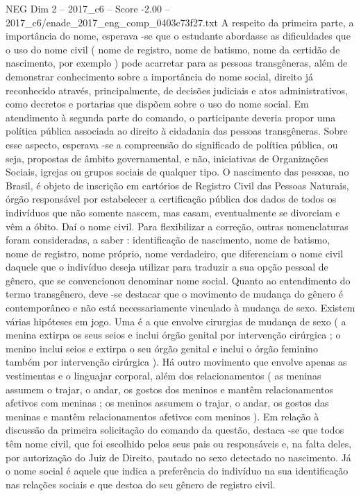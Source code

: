 \begin{textsample}{NEG Dim 2 – 2017\_c6 – Score -2.00 – 2017\_c6/enade\_2017\_eng\_comp\_0403c73f27.txt}
A respeito da primeira parte, a importância do nome, esperava -se que o estudante abordasse as dificuldades que o uso do nome civil ( nome de registro, nome de batismo, nome da certidão de nascimento, por exemplo ) pode acarretar para as pessoas transgêneras, além de demonstrar conhecimento sobre a importância do nome social, direito já reconhecido através, principalmente, de decisões judiciais e atos administrativos, como decretos e portarias que dispõem sobre o uso do nome social.
Em atendimento à segunda parte do comando, o participante deveria propor uma política pública associada ao direito à cidadania das pessoas transgêneras.
Sobre esse aspecto, esperava -se a compreensão do significado de política pública, ou seja, propostas de âmbito governamental, e não, iniciativas de Organizações Sociais, igrejas ou grupos sociais de qualquer tipo.
O nascimento das pessoas, no Brasil, é objeto de inscrição em cartórios de Registro Civil das Pessoas Naturais, órgão responsável por estabelecer a certificação pública dos dados de todos os indivíduos que não somente nascem, mas casam, eventualmente se divorciam e vêm a óbito.
Daí o nome civil.
Para flexibilizar a correção, outras nomenclaturas foram consideradas, a saber : identificação de nascimento, nome de batismo, nome de registro, nome próprio, nome verdadeiro, que diferenciam o nome civil daquele que o indivíduo deseja utilizar para traduzir a sua opção pessoal de gênero, que se convencionou denominar nome social.
Quanto ao entendimento do termo transgênero, deve -se destacar que o movimento de mudança do gênero é contemporâneo e não está necessariamente vinculado à mudança de sexo.
Existem várias hipóteses em jogo.
Uma é a que envolve cirurgias de mudança de sexo ( a menina extirpa os seus seios e inclui órgão genital por intervenção cirúrgica ; o menino inclui seios e extirpa o seu órgão genital e inclui o órgão feminino também por intervenção cirúrgica ).
Há outro movimento que envolve apenas as vestimentas e o linguajar corporal, além dos relacionamentos ( as meninas assumem o trajar, o andar, os gostos dos meninos e mantêm relacionamentos afetivos com meninas ; os meninos assumem o trajar, o andar, os gostos das meninas e mantêm relacionamentos afetivos com meninos ).
Em relação à discussão da primeira solicitação do comando da questão, destaca -se que todos têm nome civil, que foi escolhido pelos seus pais ou responsáveis e, na falta deles, por autorização do Juiz de Direito, pautado no sexo detectado no nascimento.
Já o nome social é aquele que indica a preferência do indivíduo na sua identificação nas relações sociais e que destoa do seu gênero de registro civil.

\end{textsample}
